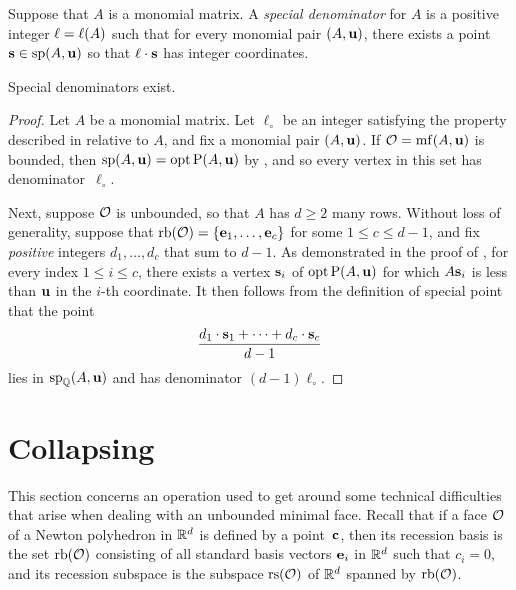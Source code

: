 \documentclass[11pt]{amsart}
\begin{document}
\begin{definition}  Suppose that $A$ is a monomial matrix. A \emph{special denominator} for $A$ is a positive integer $\ell = \ell(A)$ such that for every monomial pair $(A, \mathbf{u})$, there exists a point $\mathbf{s} \in \operatorname{sp}(A, \mathbf{u})$ so that $\ell \cdot \mathbf{s}$ has integer coordinates.
\end{definition}

\begin{theorem}
\label{special-denominators-exist:  T}
Special denominators exist.
\end{theorem}

\begin{proof}
   Let $A$ be a monomial matrix.
   Let $\ell_{\circ}$ be an integer satisfying the property described in  relative to $A$, and fix a monomial pair $(A, \mathbf{u})$.
   If $\mathcal{O} = \operatorname{mf}(A, \mathbf{u})$ is bounded, then $\operatorname{sp}(A, \mathbf{u}) = \operatorname{opt} \mathrm{P}(A, \mathbf{u})$ by , and so every vertex in this set has denominator~$\ell_{\circ}$.

   Next, suppose $\mathcal{O}$ is unbounded, so that $A$ has $d \geq 2$ many rows.
   Without loss of generality, suppose that $\operatorname{rb}(\mathcal{O}) = \{ \mathbf{e}_1, \ldots, \mathbf{e}_c \}$ for some $1 \leq c \leq d-1$, and fix \emph{positive} integers $d_1, \ldots, d_c$ that sum to $d-1$.
   As demonstrated in the  proof of , for every index  $1 \leq i \leq c$, there exists a vertex $\mathbf{s}_i$ of $\operatorname{opt} \mathrm{P}(A, \mathbf{u})$ for which $A \mathbf{s}_i$ is less than $\mathbf{u}$ in the $i$-th coordinate.
   It then follows from the definition of special point that the point
   \[ \frac{ d_1 \cdot \mathbf{s}_1 + \cdots + d_c \cdot  \mathbf{s}_c}{d-1}  \]
   lies in $\operatorname{sp}_{\mathbb{Q}}(A, \mathbf{u})$ and has denominator $(d-1)\ell_{\circ}$.
\end{proof}

\newpage
\section{Collapsing}

This section concerns an operation used to get around some technical difficulties that arise when dealing with an unbounded minimal face.
Recall that if a face $\mathcal{O}$ of a Newton polyhedron in $\mathbb{R}^d$ is defined by a point~$\mathbf{c}$, then its recession basis is the set $\operatorname{rb}(\mathcal{O})$ consisting of all standard basis vectors $\mathbf{e}_i$ in $\mathbb{R}^d$ such that $c_i = 0$, and its recession subspace is the subspace $\operatorname{rs}(\mathcal{O})$ of $\mathbb{R}^d$ spanned by $\operatorname{rb}(\mathcal{O})$.
\end{document}
